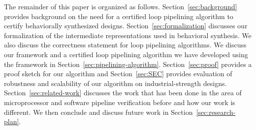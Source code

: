 The remainder of this paper is organized as
follows. Section~\ref{sec:background} provides background on the need for a certified loop pipelining algorithm 
to certify behaviorally synthesized designs. Section~\ref{sec:formalization} 
discusses our formalization of the intermediate representations used in behavioral synthesis.
We also discuss the correctness statement for loop pipelining algorithms. 
We discuss our framework and a certified loop pipelining algorithm we have developed using the framework in Section~\ref{sec:pipelining-algorithm}. Section~\ref{sec:proof} provides a proof sketch for our algorithm and Section~\ref{sec:SEC} provides evaluation of robustness and 
scalability of our algorithm on industrial-strength designs. Section~\ref{sec:related-work} discusses the work that has been done in the area of microprocessor and software pipeline verification before and how our work is different. We then conclude and discuss future work in Section~\ref{sec:research-plan}.


